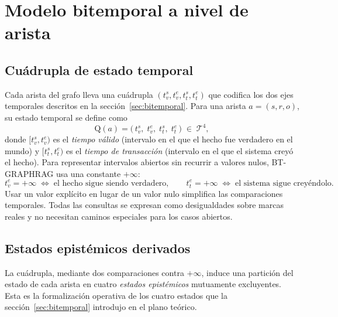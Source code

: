 \section{Modelo bitemporal a nivel de arista}\label{sec:bt-bitemporal}

\subsection{Cuádrupla de estado temporal}

Cada arista del grafo lleva una cuádrupla $(t_v^s, t_v^e, t_t^s, t_t^e)$ que codifica los dos ejes temporales descritos en la sección~\ref{sec:bitemporal}. Para una arista $a = (s, r, o)$, su estado temporal se define como
\begin{equation}
\mathrm{Q}(a) = \bigl(\,t_v^s,\; t_v^e,\; t_t^s,\; t_t^e\,\bigr) \;\in\; \mathcal{T}^4,
\end{equation}
donde $[t_v^s, t_v^e)$ es el \emph{tiempo válido} (intervalo en el que el hecho fue verdadero en el mundo) y $[t_t^s, t_t^e)$ es el \emph{tiempo de transacción} (intervalo en el que el sistema creyó el hecho). Para representar intervalos abiertos sin recurrir a valores nulos, BT-GRAPHRAG usa una constante $+\infty$:
\begin{equation}
t_v^e = +\infty \;\Longleftrightarrow\; \text{el hecho sigue siendo verdadero}, \qquad
t_t^e = +\infty \;\Longleftrightarrow\; \text{el sistema sigue creyéndolo}.
\end{equation}
Usar un valor explícito en lugar de un valor nulo simplifica las comparaciones temporales. Todas las consultas se expresan como desigualdades sobre marcas reales y no necesitan caminos especiales para los casos abiertos.

\subsection{Estados epistémicos derivados}

La cuádrupla, mediante dos comparaciones contra $+\infty$, induce una partición del estado de cada arista en cuatro \emph{estados epistémicos} mutuamente excluyentes. Esta es la formalización operativa de los cuatro estados que la sección~\ref{sec:bitemporal} introdujo en el plano teórico.

